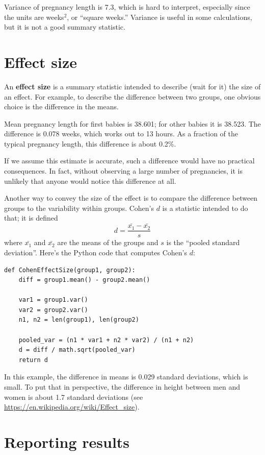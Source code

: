 \documentclass[12pt]{book}
\begin{document}
Variance of pregnancy length is 7.3, which is hard to interpret,
especially since the units are weeks$^2$, or ``square weeks.''
Variance is useful in some calculations, but it is not
a good summary statistic.


\section{Effect size}

An {\bf effect size} is a summary statistic intended to describe (wait
for it) the size of an effect.  For example, to describe the
difference between two groups, one obvious choice is the difference in
the means.  

Mean pregnancy length for first babies is 38.601; for
other babies it is 38.523.  The difference is 0.078 weeks, which works
out to 13 hours.  As a fraction of the typical pregnancy length, this
difference is about 0.2\%.

If we assume this estimate is accurate, such a difference
would have no practical consequences.  In fact, without
observing a large number of pregnancies, it is unlikely that anyone
would notice this difference at all.

Another way to convey the size of the effect is to compare the
difference between groups to the variability within groups.
Cohen's $d$ is a statistic intended to do that; it is defined
%
\[ d = \frac{\bar{x_1} - \bar{x_2}}{s}  \]
%
where $\bar{x_1}$ and $\bar{x_2}$ are the means of the groups and
$s$ is the ``pooled standard deviation''.  Here's the Python
code that computes Cohen's $d$:

\begin{verbatim}
def CohenEffectSize(group1, group2):
    diff = group1.mean() - group2.mean()

    var1 = group1.var()
    var2 = group2.var()
    n1, n2 = len(group1), len(group2)

    pooled_var = (n1 * var1 + n2 * var2) / (n1 + n2)
    d = diff / math.sqrt(pooled_var)
    return d
\end{verbatim}

In this example, the difference in means is 0.029 standard deviations,
which is small.  To put that in perspective, the difference in
height between men and women is about 1.7 standard deviations (see
\url{https://en.wikipedia.org/wiki/Effect_size}).


\section{Reporting results}
\end{document}
